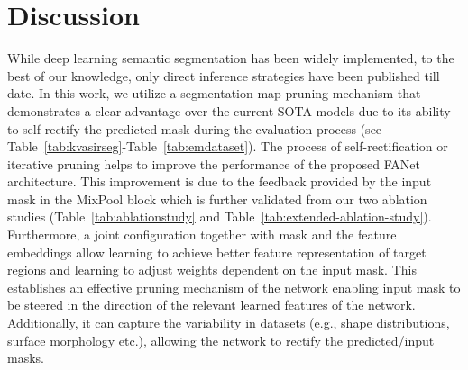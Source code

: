 \documentclass[journal]{IEEEtran}
\begin{document}
\section{Discussion}
While deep learning semantic segmentation has been widely implemented, to the best of our knowledge, only direct inference strategies have been published till date. In this work, we utilize a segmentation map pruning mechanism that demonstrates a clear advantage over the current \ac{SOTA} models due to its ability to self-rectify the predicted mask during the evaluation process (see Table~\ref{tab:kvasirseg}-Table~\ref{tab:emdataset}). The process of self-rectification or iterative pruning helps to improve the performance of the proposed FANet architecture. This improvement is due to the feedback provided by the input mask in the MixPool block which is further validated from our two ablation studies (Table~\ref{tab:ablationstudy} and Table~\ref{tab:extended-ablation-study}). Furthermore, a joint configuration together with mask and the feature embeddings allow learning to achieve better feature representation of target regions and learning to adjust weights dependent on the input mask. This establishes an effective pruning mechanism of the network enabling input mask to be steered in the direction of the relevant {learned} features of the network. Additionally, it can capture the variability in datasets (e.g., shape distributions, surface morphology etc.), allowing the network to rectify the predicted/input masks.
\end{document}
